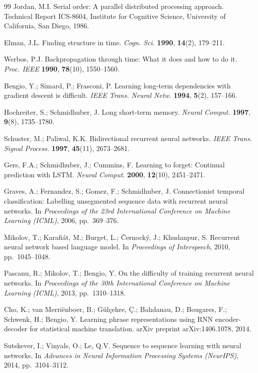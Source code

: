 \documentclass[pdflatex,sn-mathphys-num]{sn-jnl}%
\theoremstyle{thmstyleone}%
\theoremstyle{thmstyletwo}%
\theoremstyle{thmstylethree}%
\begin{document}
\begin{thebibliography}{99}
 Jordan, M.I. Serial order: A parallel distributed processing approach. Technical Report ICS-8604, Institute for Cognitive Science, University of California, San Diego, 1986.

 Elman, J.L. Finding structure in time. \textit{Cogn. Sci.} \textbf{1990}, \textbf{14}(2), 179--211.

 Werbos, P.J. Backpropagation through time: What it does and how to do it. \textit{Proc. IEEE} \textbf{1990}, \textbf{78}(10), 1550--1560. 

 Bengio, Y.; Simard, P.; Frasconi, P. Learning long-term dependencies with gradient descent is difficult. \textit{IEEE Trans. Neural Netw.} \textbf{1994}, \textbf{5}(2), 157--166. 

 Hochreiter, S.; Schmidhuber, J. Long short-term memory. \textit{Neural Comput.} \textbf{1997}, \textbf{9}(8), 1735--1780. 

 Schuster, M.; Paliwal, K.K. Bidirectional recurrent neural networks. \textit{IEEE Trans. Signal Process.} \textbf{1997}, \textbf{45}(11), 2673--2681. 

 Gers, F.A.; Schmidhuber, J.; Cummins, F. Learning to forget: Continual prediction with LSTM. \textit{Neural Comput.} \textbf{2000}, \textbf{12}(10), 2451--2471. 

 Graves, A.; Fernandez, S.; Gomez, F.; Schmidhuber, J. Connectionist temporal classification: Labelling unsegmented sequence data with recurrent neural networks. In \textit{Proceedings of the 23rd International Conference on Machine Learning (ICML)}, 2006, pp.~369--376. 

 Mikolov, T.; Karafiát, M.; Burget, L.; Černocký, J.; Khudanpur, S. Recurrent neural network based language model. In \textit{Proceedings of Interspeech}, 2010, pp.~1045--1048.

 Pascanu, R.; Mikolov, T.; Bengio, Y. On the difficulty of training recurrent neural networks. In \textit{Proceedings of the 30th International Conference on Machine Learning (ICML)}, 2013, pp.~1310--1318. 

 Cho, K.; van Merriënboer, B.; Gülçehre, Ç.; Bahdanau, D.; Bougares, F.; Schwenk, H.; Bengio, Y. Learning phrase representations using RNN encoder-decoder for statistical machine translation. arXiv preprint arXiv:1406.1078, 2014. 

 Sutskever, I.; Vinyals, O.; Le, Q.V. Sequence to sequence learning with neural networks. In \textit{Advances in Neural Information Processing Systems (NeurIPS)}, 2014, pp.~3104--3112. 


\end{thebibliography}
\end{document}
